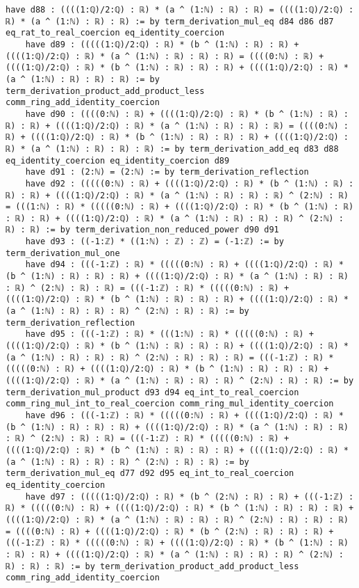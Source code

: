 \documentclass{article}
\begin{document}
\begin{tcolorbox}[colback=white!10, width=\linewidth]
\begin{lstlisting}[language=Lean4]
    have d88 : ((((1:ℚ)/2:ℚ) : ℝ) * (a ^ (1:ℕ) : ℝ) : ℝ) = ((((1:ℚ)/2:ℚ) : ℝ) * (a ^ (1:ℕ) : ℝ) : ℝ) := by term_derivation_mul_eq d84 d86 d87 eq_rat_to_real_coercion eq_identity_coercion
    have d89 : (((((1:ℚ)/2:ℚ) : ℝ) * (b ^ (1:ℕ) : ℝ) : ℝ) + ((((1:ℚ)/2:ℚ) : ℝ) * (a ^ (1:ℕ) : ℝ) : ℝ) : ℝ) = ((((0:ℕ) : ℝ) + ((((1:ℚ)/2:ℚ) : ℝ) * (b ^ (1:ℕ) : ℝ) : ℝ) : ℝ) + ((((1:ℚ)/2:ℚ) : ℝ) * (a ^ (1:ℕ) : ℝ) : ℝ) : ℝ) := by term_derivation_product_add_product_less comm_ring_add_identity_coercion
    have d90 : ((((0:ℕ) : ℝ) + ((((1:ℚ)/2:ℚ) : ℝ) * (b ^ (1:ℕ) : ℝ) : ℝ) : ℝ) + ((((1:ℚ)/2:ℚ) : ℝ) * (a ^ (1:ℕ) : ℝ) : ℝ) : ℝ) = ((((0:ℕ) : ℝ) + ((((1:ℚ)/2:ℚ) : ℝ) * (b ^ (1:ℕ) : ℝ) : ℝ) : ℝ) + ((((1:ℚ)/2:ℚ) : ℝ) * (a ^ (1:ℕ) : ℝ) : ℝ) : ℝ) := by term_derivation_add_eq d83 d88 eq_identity_coercion eq_identity_coercion d89
    have d91 : (2:ℕ) = (2:ℕ) := by term_derivation_reflection
    have d92 : (((((0:ℕ) : ℝ) + ((((1:ℚ)/2:ℚ) : ℝ) * (b ^ (1:ℕ) : ℝ) : ℝ) : ℝ) + ((((1:ℚ)/2:ℚ) : ℝ) * (a ^ (1:ℕ) : ℝ) : ℝ) : ℝ) ^ (2:ℕ) : ℝ) = (((1:ℕ) : ℝ) * (((((0:ℕ) : ℝ) + ((((1:ℚ)/2:ℚ) : ℝ) * (b ^ (1:ℕ) : ℝ) : ℝ) : ℝ) + ((((1:ℚ)/2:ℚ) : ℝ) * (a ^ (1:ℕ) : ℝ) : ℝ) : ℝ) ^ (2:ℕ) : ℝ) : ℝ) := by term_derivation_non_reduced_power d90 d91
    have d93 : ((-1:ℤ) * ((1:ℕ) : ℤ) : ℤ) = (-1:ℤ) := by term_derivation_mul_one
    have d94 : (((-1:ℤ) : ℝ) * (((((0:ℕ) : ℝ) + ((((1:ℚ)/2:ℚ) : ℝ) * (b ^ (1:ℕ) : ℝ) : ℝ) : ℝ) + ((((1:ℚ)/2:ℚ) : ℝ) * (a ^ (1:ℕ) : ℝ) : ℝ) : ℝ) ^ (2:ℕ) : ℝ) : ℝ) = (((-1:ℤ) : ℝ) * (((((0:ℕ) : ℝ) + ((((1:ℚ)/2:ℚ) : ℝ) * (b ^ (1:ℕ) : ℝ) : ℝ) : ℝ) + ((((1:ℚ)/2:ℚ) : ℝ) * (a ^ (1:ℕ) : ℝ) : ℝ) : ℝ) ^ (2:ℕ) : ℝ) : ℝ) := by term_derivation_reflection
    have d95 : (((-1:ℤ) : ℝ) * (((1:ℕ) : ℝ) * (((((0:ℕ) : ℝ) + ((((1:ℚ)/2:ℚ) : ℝ) * (b ^ (1:ℕ) : ℝ) : ℝ) : ℝ) + ((((1:ℚ)/2:ℚ) : ℝ) * (a ^ (1:ℕ) : ℝ) : ℝ) : ℝ) ^ (2:ℕ) : ℝ) : ℝ) : ℝ) = (((-1:ℤ) : ℝ) * (((((0:ℕ) : ℝ) + ((((1:ℚ)/2:ℚ) : ℝ) * (b ^ (1:ℕ) : ℝ) : ℝ) : ℝ) + ((((1:ℚ)/2:ℚ) : ℝ) * (a ^ (1:ℕ) : ℝ) : ℝ) : ℝ) ^ (2:ℕ) : ℝ) : ℝ) := by term_derivation_mul_product d93 d94 eq_int_to_real_coercion comm_ring_mul_int_to_real_coercion comm_ring_mul_identity_coercion
    have d96 : (((-1:ℤ) : ℝ) * (((((0:ℕ) : ℝ) + ((((1:ℚ)/2:ℚ) : ℝ) * (b ^ (1:ℕ) : ℝ) : ℝ) : ℝ) + ((((1:ℚ)/2:ℚ) : ℝ) * (a ^ (1:ℕ) : ℝ) : ℝ) : ℝ) ^ (2:ℕ) : ℝ) : ℝ) = (((-1:ℤ) : ℝ) * (((((0:ℕ) : ℝ) + ((((1:ℚ)/2:ℚ) : ℝ) * (b ^ (1:ℕ) : ℝ) : ℝ) : ℝ) + ((((1:ℚ)/2:ℚ) : ℝ) * (a ^ (1:ℕ) : ℝ) : ℝ) : ℝ) ^ (2:ℕ) : ℝ) : ℝ) := by term_derivation_mul_eq d77 d92 d95 eq_int_to_real_coercion eq_identity_coercion
    have d97 : (((((1:ℚ)/2:ℚ) : ℝ) * (b ^ (2:ℕ) : ℝ) : ℝ) + (((-1:ℤ) : ℝ) * (((((0:ℕ) : ℝ) + ((((1:ℚ)/2:ℚ) : ℝ) * (b ^ (1:ℕ) : ℝ) : ℝ) : ℝ) + ((((1:ℚ)/2:ℚ) : ℝ) * (a ^ (1:ℕ) : ℝ) : ℝ) : ℝ) ^ (2:ℕ) : ℝ) : ℝ) : ℝ) = ((((0:ℕ) : ℝ) + ((((1:ℚ)/2:ℚ) : ℝ) * (b ^ (2:ℕ) : ℝ) : ℝ) : ℝ) + (((-1:ℤ) : ℝ) * (((((0:ℕ) : ℝ) + ((((1:ℚ)/2:ℚ) : ℝ) * (b ^ (1:ℕ) : ℝ) : ℝ) : ℝ) + ((((1:ℚ)/2:ℚ) : ℝ) * (a ^ (1:ℕ) : ℝ) : ℝ) : ℝ) ^ (2:ℕ) : ℝ) : ℝ) : ℝ) := by term_derivation_product_add_product_less comm_ring_add_identity_coercion

\end{lstlisting}
\end{tcolorbox}
\end{document}
